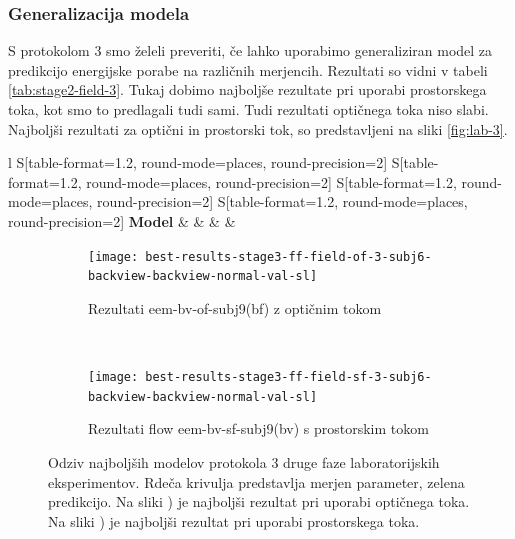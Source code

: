 \subsubsection{Generalizacija modela}
S protokolom 3 smo želeli preveriti, če lahko uporabimo generaliziran model za predikcijo energijske porabe na različnih merjencih. Rezultati so vidni v tabeli \ref{tab:stage2-field-3}. Tukaj dobimo najboljše rezultate pri uporabi prostorskega toka, kot smo to predlagali tudi sami. Tudi rezultati optičnega toka niso slabi. Najboljši rezultati za optični in prostorski tok, so predstavljeni na sliki \ref{fig:lab-3}.

\begin{table}[!htbp]
	\centering
	\begin{tabular}{l S[table-format=1.2, round-mode=places, round-precision=2] S[table-format=1.2, round-mode=places, round-precision=2] S[table-format=1.2, round-mode=places, round-precision=2] S[table-format=1.2, round-mode=places, round-precision=2]}
		\toprule
		\textbf{Model} &  &  &  &  \\
		\midrule
		\bottomrule
	\end{tabular}
	\caption[Validacijske metrike za protokol 3 2. faze terenskih eksperimentov]{Validacijske metrike za protokol 3 druge faze terenskih eksperimentov.}
	\label{tab:stage2-field-3}
\end{table}

\begin{figure}[!htbp]
	\centering
	\begin{subfigure}[t]{0.45\columnwidth}
		\texttt{[image: best-results-stage3-ff-field-of-3-subj6-backview-backview-normal-val-sl]}
		\caption{Rezultati eem-bv-of-subj9(bf) z optičnim tokom}
		\label{fig:field-of-3}
	\end{subfigure}
	~
	\begin{subfigure}[t]{0.45\columnwidth}
		\texttt{[image: best-results-stage3-ff-field-sf-3-subj6-backview-backview-normal-val-sl]}
		\caption{Rezultati flow eem-bv-sf-subj9(bv) s prostorskim tokom}
		\label{fig:field-sf-3}
	\end{subfigure}
	\caption[Odziv SUBJ9 modelov protokola 3 2. faze lab. eksperimentov]{Odziv najboljših modelov protokola 3 druge faze laboratorijskih eksperimentov. Rdeča krivulja predstavlja merjen parameter, zelena predikcijo. Na sliki ) je najboljši rezultat pri uporabi optičnega toka. Na sliki ) je najboljši rezultat pri uporabi prostorskega toka.}
	\label{fig:field-3}
\end{figure}


